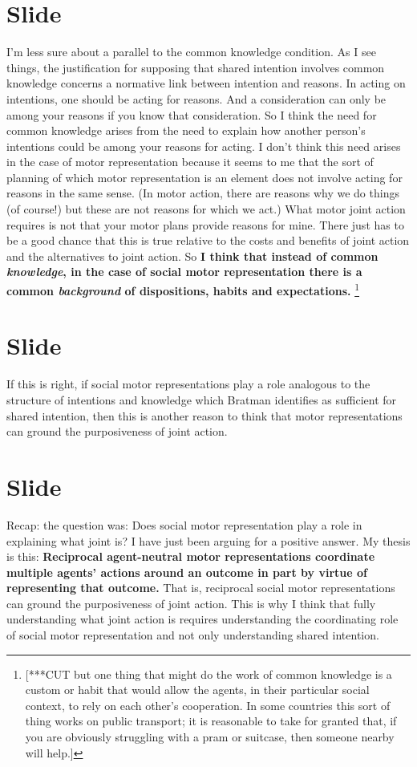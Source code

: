 \documentclass[12pt,\papersize]{extarticle}
\begin{document}
\section{Slide}
I’m less sure about a parallel to the common knowledge condition.
As I see things, the justification for supposing that shared intention involves common knowledge concerns a normative link between intention and reasons.
In acting on intentions, one should be acting for reasons.
And a consideration can only be among your reasons if you know that consideration.
So I think the need for common knowledge arises from the need to explain how another person’s intentions could be among your reasons for acting.
I don’t think this need arises in the case of motor representation because it seems to me that the sort of planning of which motor representation is an element does not involve acting for reasons in the same sense.  
(In motor action, there are reasons why we do things (of course!) but these are not  reasons for which we act.)
What motor joint action requires is not that your motor plans provide reasons for mine.
There just has to be a good chance that this is true relative to the costs and benefits of joint action and the alternatives to joint action.
So \textbf{I think that instead of common \emph{knowledge}, in the case of social motor representation there is a common \emph{background} of dispositions, habits and expectations.}%
\footnote{
[***CUT but one thing that might do the work of common knowledge is a custom or habit 
that would allow the agents, in their particular social context, to rely on each other’s cooperation.
In some countries this sort of thing works on public transport; 
it is reasonable to take for granted that, if you are obviously struggling with a pram or suitcase, then someone nearby will help.]
}



\section{Slide}
If this is right, if social motor representations play a role analogous to the structure of intentions and knowledge which Bratman identifies as sufficient for shared intention, then this is another reason to think that motor representations can ground the purposiveness of joint action.



\section{Slide}
Recap: the question was: Does social motor representation  play a role in explaining what joint is?
I have just been arguing for a positive answer.
My thesis is this:
\textbf{Reciprocal agent-neutral motor representations coordinate multiple agents’ actions around an outcome in part by virtue of representing that outcome.}
That is, reciprocal social motor representations can ground the purposiveness of joint action.
This is why I think that fully understanding what joint action is requires understanding the coordinating role of social motor representation and not only understanding shared intention.
\end{document}
